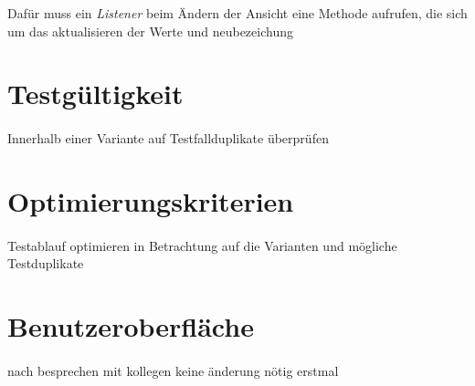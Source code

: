 Dafür muss ein \textit{Listener} beim Ändern der Ansicht eine Methode aufrufen, die sich um das aktualisieren der Werte und neubezeichung

\newpage
\section{Testgültigkeit}
\paragraph{}
Innerhalb einer Variante auf Testfallduplikate überprüfen

\newpage
\section{Optimierungskriterien}
\paragraph{}
Testablauf optimieren in Betrachtung auf die Varianten und mögliche Testduplikate

\newpage
\section{Benutzeroberfläche}
\paragraph{}


nach besprechen mit kollegen keine änderung nötig erstmal \\